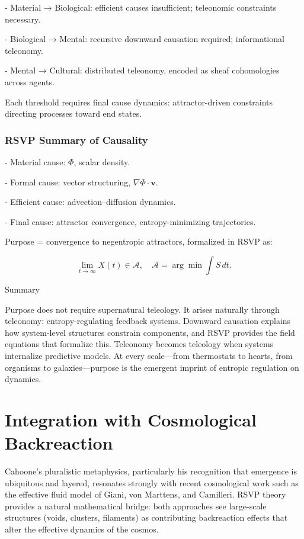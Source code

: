 \documentclass[12pt]{book}
\begin{document}
- Material → Biological: efficient causes insufficient; teleonomic constraints necessary.

- Biological → Mental: recursive downward causation required; informational teleonomy.

- Mental → Cultural: distributed teleonomy, encoded as sheaf cohomologies across agents.

Each threshold requires final cause dynamics: attractor-driven constraints directing processes toward end states.

\subsection{RSVP Summary of Causality}
- Material cause: \( \Phi \), scalar density.

- Formal cause: vector structuring, \( \nabla \Phi \cdot \mathbf{v} \).

- Efficient cause: advection–diffusion dynamics.

- Final cause: attractor convergence, entropy-minimizing trajectories.

Purpose = convergence to negentropic attractors, formalized in RSVP as:

\[ \lim_{t \to \infty} X(t) \in \mathcal{A}, \quad \mathcal{A} = \arg\min \int S \, dt. \]

Summary

Purpose does not require supernatural teleology. It arises naturally through teleonomy: entropy-regulating feedback systems. Downward causation explains how system-level structures constrain components, and RSVP provides the field equations that formalize this. Teleonomy becomes teleology when systems internalize predictive models. At every scale—from thermostats to hearts, from organisms to galaxies—purpose is the emergent imprint of entropic regulation on dynamics.

\chapter{Integration with Cosmological Backreaction}
Cahoone’s pluralistic metaphysics, particularly his recognition that emergence is ubiquitous and layered, resonates strongly with recent cosmological work such as the effective fluid model of Giani, von Marttens, and Camilleri. RSVP theory provides a natural mathematical bridge: both approaches see large-scale structures (voids, clusters, filaments) as contributing backreaction effects that alter the effective dynamics of the cosmos.
\end{document}
